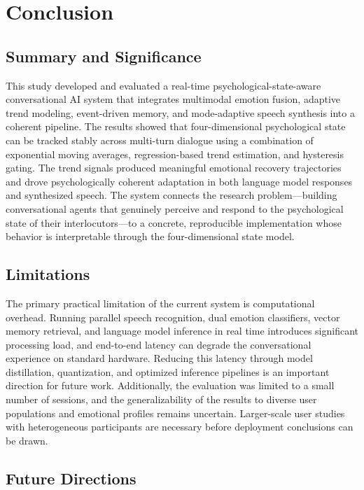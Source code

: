 \documentclass[conference]{IEEEtran}
\begin{document}
\section{Conclusion}

\subsection{Summary and Significance}

This study developed and evaluated a real-time psychological-state-aware conversational AI system that integrates multimodal emotion fusion, adaptive trend modeling, event-driven memory, and mode-adaptive speech synthesis into a coherent pipeline. The results showed that four-dimensional psychological state can be tracked stably across multi-turn dialogue using a combination of exponential moving averages, regression-based trend estimation, and hysteresis gating. The trend signals produced meaningful emotional recovery trajectories and drove psychologically coherent adaptation in both language model responses and synthesized speech. The system connects the research problem---building conversational agents that genuinely perceive and respond to the psychological state of their interlocutors---to a concrete, reproducible implementation whose behavior is interpretable through the four-dimensional state model.

\subsection{Limitations}

The primary practical limitation of the current system is computational overhead. Running parallel speech recognition, dual emotion classifiers, vector memory retrieval, and language model inference in real time introduces significant processing load, and end-to-end latency can degrade the conversational experience on standard hardware. Reducing this latency through model distillation, quantization, and optimized inference pipelines is an important direction for future work. Additionally, the evaluation was limited to a small number of sessions, and the generalizability of the results to diverse user populations and emotional profiles remains uncertain. Larger-scale user studies with heterogeneous participants are necessary before deployment conclusions can be drawn.

\subsection{Future Directions}
\end{document}
